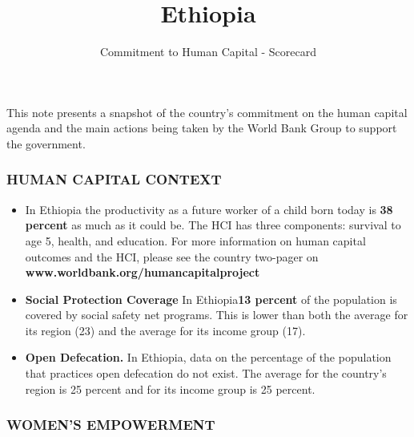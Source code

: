 \documentclass[9.2pt,twocolumn]{article}
\title{Ethiopia}
\author{Commitment to Human Capital - Scorecard}
\date{}
\begin{document}
\maketitle

\newcommand\boldblue[1]{\textcolor{bondiblue}{\textbf{#1}}}

This note presents a snapshot of the country's commitment on the human
capital agenda and the main actions being taken by the World Bank Group
to support the government.

\hypertarget{section}{%
\subsubsection{\texorpdfstring{\textcolor{bondiblue}{\textbf{H\small{UMAN CAPITAL CONTEXT}}}}{}}\label{section}}

\begin{itemize}
\item
  In Ethiopia the productivity as a future worker of a child born today
  is \textbf{38 percent} as much as it could be. The HCI has three
  components: survival to age 5, health, and education. For more
  information on human capital outcomes and the HCI, please see the
  country two-pager on
  \textcolor{bondiblue}{\textbf{www.worldbank.org/humancapitalproject}}
\item
  \textbf{Social Protection Coverage} In Ethiopia\textbf{13 percent} of
  the population is covered by social safety net programs. This is lower
  than both the average for its region (23) and the average for its
  income group (17).
\item
  \textbf{Open Defecation.} In Ethiopia, data on the percentage of the
  population that practices open defecation do not exist. The average
  for the country's region is 25 percent and for its income group is 25
  percent.
\end{itemize}

\hypertarget{section-1}{%
\subsubsection{\texorpdfstring{\textcolor{bondiblue}{\textbf{W\small{OMEN'S EMPOWERMENT}}}}{}}\label{section-1}}
\end{document}
